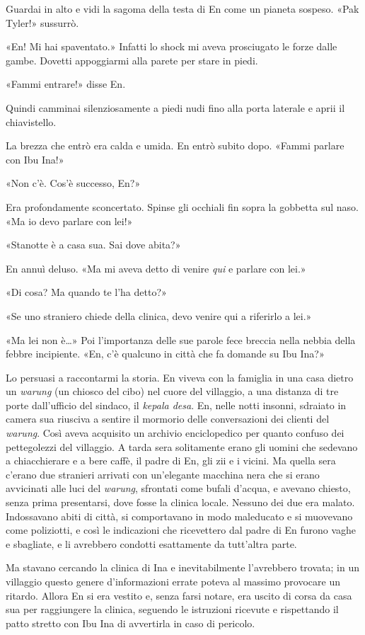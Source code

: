 Guardai in alto e vidi la sagoma della testa di En come un pianeta
sospeso. «Pak Tyler!» sussurrò.

«En! Mi hai spaventato.» Infatti lo shock mi aveva prosciugato le forze
dalle gambe. Dovetti appoggiarmi alla parete per stare in piedi.

«Fammi entrare!» disse En.

Quindi camminai silenziosamente a piedi nudi fino alla porta laterale e
aprii il chiavistello.

La brezza che entrò era calda e umida. En entrò subito dopo. «Fammi
parlare con Ibu Ina!»

«Non c'è. Cos'è successo, En?»

Era profondamente sconcertato. Spinse gli occhiali fin sopra la gobbetta
sul naso. «Ma io devo parlare con lei!»

«Stanotte è a casa sua. Sai dove abita?»

En annuì deluso. «Ma mi aveva detto di venire \emph{qui} e parlare con
lei.»

«Di cosa? Ma quando te l'ha detto?»

«Se uno straniero chiede della clinica, devo venire qui a riferirlo a
lei.»

«Ma lei non è\ldots» Poi l'importanza delle sue parole fece breccia
nella nebbia della febbre incipiente. «En, c'è qualcuno in città che fa
domande su Ibu Ina?»

Lo persuasi a raccontarmi la storia. En viveva con la famiglia in una
casa dietro un \emph{warung} (un chiosco del cibo) nel cuore del
villaggio, a una distanza di tre porte dall'ufficio del sindaco, il
\emph{kepala desa}. En, nelle notti insonni, sdraiato in camera sua
riusciva a sentire il mormorio delle conversazioni dei clienti del
\emph{warung}. Così aveva acquisito un archivio enciclopedico per quanto
confuso dei pettegolezzi del villaggio. A tarda sera solitamente erano
gli uomini che sedevano a chiacchierare e a bere caffè, il padre di En,
gli zii e i vicini. Ma quella sera c'erano due stranieri arrivati con
un'elegante macchina nera che si erano avvicinati alle luci del
\emph{warung}, sfrontati come bufali d'acqua, e avevano chiesto, senza
prima presentarsi, dove fosse la clinica locale. Nessuno dei due era
malato. Indossavano abiti di città, si comportavano in modo maleducato e
si muovevano come poliziotti, e così le indicazioni che ricevettero dal
padre di En furono vaghe e sbagliate, e li avrebbero condotti
esattamente da tutt'altra parte.

Ma stavano cercando la clinica di Ina e inevitabilmente l'avrebbero
trovata; in un villaggio questo genere d'informazioni errate poteva al
massimo provocare un ritardo. Allora En si era vestito e, senza farsi
notare, era uscito di corsa da casa sua per raggiungere la clinica,
seguendo le istruzioni ricevute e rispettando il patto stretto con Ibu
Ina di avvertirla in caso di pericolo.

